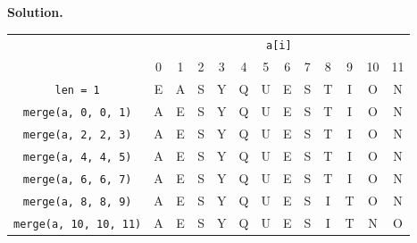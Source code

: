 \documentclass[12pt, a4paper]{article}
\newenvironment{sol}[1][Solution]
{\par\medskip\noindent \textbf{#1.} }
{\medskip}
\begin{document}
	\begin{sol}
		\begin{center}
			\begin{tabular}{c|cccccccccccc}
				{} & \multicolumn{12}{c}{\texttt{a[i]}}\\
				{} & 0 & 1 & 2 & 3 & 4 & 5 & 6 & 7 & 8 & 9 & 10  & 11 \\
				\hline
				\texttt{len = 1} & E & A & S & Y & Q & U & E & S & T & I & O & N \\
				
	\texttt{merge(a, {\color{red}0}, 0, {\color{red}1})}
	& {\color{black}A} & {\color{black}E} & {\color{gray}S} & {\color{gray}Y} & {\color{gray}Q} & {\color{gray}U}
	& {\color{gray}E} & {\color{gray}S} & {\color{gray}T} & {\color{gray}I} & {\color{gray}O} & {\color{gray}N}\\
	
	\texttt{merge(a, {\color{red}2}, 2, {\color{red}3})}
	& {\color{gray}A} & {\color{gray}E} & {\color{black}S} & {\color{black}Y} & {\color{gray}Q} & {\color{gray}U}
	& {\color{gray}E} & {\color{gray}S} & {\color{gray}T} & {\color{gray}I} & {\color{gray}O} & {\color{gray}N}\\
	
	\texttt{merge(a, {\color{red}4}, 4, {\color{red}5})}
	& {\color{gray}A} & {\color{gray}E} & {\color{gray}S} & {\color{gray}Y} & {\color{black}Q} & {\color{black}U}
	& {\color{gray}E} & {\color{gray}S} & {\color{gray}T} & {\color{gray}I} & {\color{gray}O} & {\color{gray}N}\\
	
	\texttt{merge(a, {\color{red}6}, 6, {\color{red}7})}
	& {\color{gray}A} & {\color{gray}E} & {\color{gray}S} & {\color{gray}Y} & {\color{gray}Q} & {\color{gray}U}
	& {\color{black}E} & {\color{black}S} & {\color{gray}T} & {\color{gray}I} & {\color{gray}O} & {\color{gray}N}\\
	
	\texttt{merge(a, {\color{red}8}, 8, {\color{red}9})}
	& {\color{gray}A} & {\color{gray}E} & {\color{gray}S} & {\color{gray}Y} & {\color{gray}Q} & {\color{gray}U}
	& {\color{gray}E} & {\color{gray}S} & {\color{black}I} & {\color{black}T} & {\color{gray}O} & {\color{gray}N}\\
	
	\texttt{merge(a, {\color{red}10}, 10, {\color{red}11})}
	& {\color{gray}A} & {\color{gray}E} & {\color{gray}S} & {\color{gray}Y} & {\color{gray}Q} & {\color{gray}U}
	& {\color{gray}E} & {\color{gray}S} & {\color{gray}I} & {\color{gray}T} & {\color{black}N} & {\color{black}O}\\
	

\end{tabular}
\end{center}
\end{sol}
\end{document}
